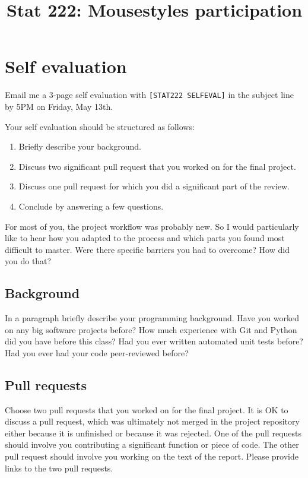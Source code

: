\documentclass[11pt, oneside]{article}   	%
\title{Stat 222: Mousestyles participation}
\begin{document}
\maketitle

\section{Self evaluation}

Email me a 3-page self evaluation with \texttt{[STAT222 SELFEVAL]} in the subject line
by 5PM on Friday, May 13th.

Your self evaluation should be structured as follows:

\begin{enumerate}

\item Briefly describe your background.

\item Discuss two significant pull request that you worked on for the final project.

\item Discuss one pull request for which you did a significant part of the review.

\item Conclude by answering a few questions.

\end{enumerate}

For most of you, the project workflow was probably new.  So I would particularly
like to hear how you adapted to the process and which parts you found most
difficult to master.  Were there specific barriers you had to overcome?  How
did you do that?

\subsection{Background}

In a paragraph briefly describe your programming background.  Have you
worked on any big software projects before?  How much experience with
Git and Python did you have before this class?  Had you ever written
automated unit tests before?  Had you ever had your code peer-reviewed
before?

\subsection{Pull requests}

Choose two pull requests that you worked on for the final project.
It is OK to discuss a pull request, which was ultimately not merged
in the project repository either because it is unfinished or because
it was rejected.
One of the pull requests should involve you contributing a significant
function or piece of code.  The other pull request should involve
you working on the text of the report.  Please provide links to the
two pull requests.
\end{document}
